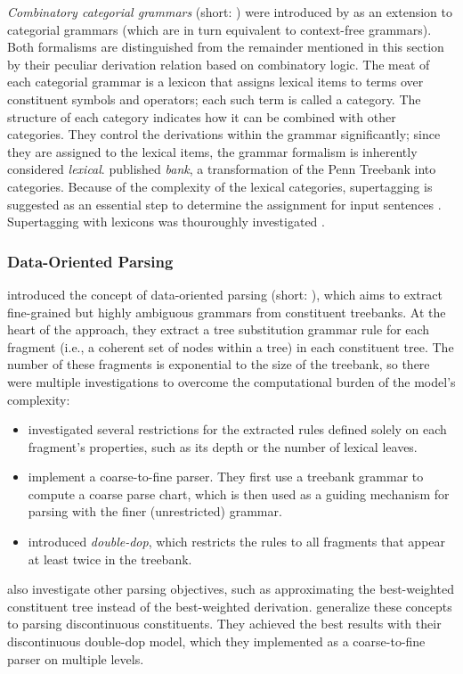 \documentclass[../document.tex]{subfiles}
\begin{document}
    \emph{Combinatory categorial grammars} (short: ) were introduced by \citet{Ste11} as an extension to categorial grammars (which are in turn equivalent to context-free grammars).
    Both formalisms are distinguished from the remainder mentioned in this section by their peculiar derivation relation based on combinatory logic.
    The meat of each categorial grammar is a lexicon that assigns lexical items to terms over constituent symbols and operators; each such term is called a category.
    The structure of each category indicates how it can be combined with other categories.
    They control the derivations within the grammar significantly; since they are assigned to the lexical items, the grammar formalism is inherently considered \emph{lexical}.
    \cite{Hoc07} published \emph{ bank}, a transformation of the Penn Treebank into  categories.
    Because of the complexity of the lexical categories, supertagging is suggested as an essential step to determine the assignment for input sentences \citep{Clark04}.
    Supertagging with  lexicons was thouroughly investigated \citep{clark2002supertagging, LewisSteedman14, vaswani2016supertagging, Kad18, StaSte20}.

    \subsubsection*{Data-Oriented Parsing}
    \citet{Bod92} introduced the concept of data-oriented parsing (short: ), which aims to extract fine-grained but highly ambiguous grammars from constituent treebanks.
    At the heart of the approach, they extract a tree substitution grammar rule for each fragment (i.e.\@, a coherent set of nodes within a tree) in each constituent tree.
    The number of these fragments is exponential to the size of the treebank, so there were multiple investigations to overcome the computational burden of the model's complexity:
    \begin{itemize}
        \item \citet{Bod01} investigated several restrictions for the extracted rules defined solely on each fragment's properties, such as its depth or the number of lexical leaves.
        \item \citet{Ban10} implement a coarse-to-fine parser. They first use a treebank grammar to compute a coarse parse chart, which is then used as a guiding mechanism for parsing with the finer (unrestricted)  grammar.
        \item \citet{San11} introduced \emph{double-dop}, which restricts the rules to all fragments that appear at least twice in the treebank.
    \end{itemize}
    \citet{San11} also investigate other parsing objectives, such as approximating the best-weighted constituent tree instead of the best-weighted derivation.
    \citet{Cra11,CraSchBod16} generalize these concepts to parsing discontinuous constituents.
    They achieved the best results with their discontinuous double-dop model, which they implemented as a coarse-to-fine parser on multiple levels.
\end{document}
